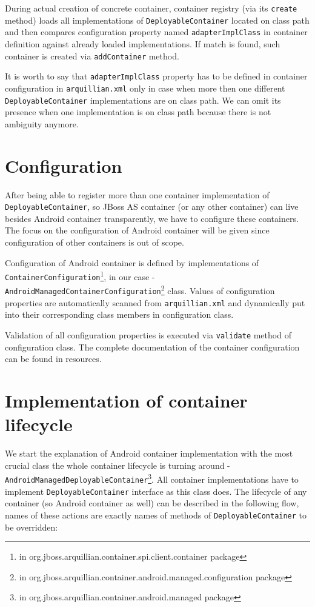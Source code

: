 \documentclass[12pt,final,oneside]{fithesis}
\begin{document}
During actual creation of concrete container, container registry (via its \texttt{create} method) loads all implementations of \texttt{DeployableContainer} located on class path and then compares configuration property named \texttt{adapterImplClass} in container definition against already loaded implementations. If match is found, such container is created via \linebreak \texttt{addContainer} method.

It is worth to say that \texttt{adapterImplClass} property has to be defined in container configuration in \texttt{arquillian.xml} only in case when more then one different \texttt{DeployableContainer} implementations are on class path. We can omit its presence when one implementation is on class path because there is not ambiguity anymore. 

	\section{Configuration}
	
After being able to register more than one container implementation of \texttt{DeployableContainer}, so JBoss AS container (or any other container) can live besides Android container transparently, we have to configure these containers. The focus on the configuration of Android container will be given since configuration of other containers is out of scope.

Configuration of Android container is defined by implementations of \texttt{ContainerConfiguration}\footnote{in org.jboss.arquillian.container.spi.client.container package}, in our case - \texttt{Android\-Managed\-Container\-Configuration}\footnote{in org.jboss.arquillian.container.android.managed.configuration package} class. Values of configuration properties are automatically scanned from \texttt{arquillian.xml} and dynamically put into their corresponding class members in configuration class.

Validation of all configuration properties is executed via \texttt{validate} method of configuration class. The complete documentation of the container configuration can be found in resources.

	\section{Implementation of container lifecycle}	
	
We start the explanation of Android container implementation with the most crucial class the whole container lifecycle is turning around - \texttt{AndroidManagedDeployableContainer}\footnote{in org.jboss.arquillian.container.android.managed package}. All container implementations have to implement \texttt{DeployableContainer} interface as this class does. The lifecycle of any container (so Android container as well) can be described in the following flow, names of these actions are exactly names of methods of \texttt{DeployableContainer} to be overridden:
\end{document}
